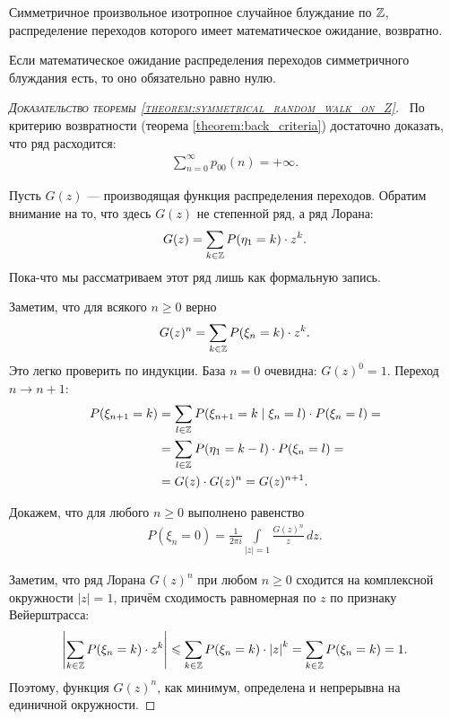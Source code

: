 \documentclass[../main.tex]{subfiles}
\begin{document}
\begin{thm}
 \label{theorem:symmetrical_random_walk_on_Z}
 Симметричное произвольное изотропное случайное блуждание по $ \mathbb{Z} $, распределение переходов которого имеет математическое ожидание, возвратно.
\end{thm}
\begin{remrk*}
 Если математическое ожидание распределения переходов симметричного блуждания есть, то оно обязательно равно нулю.
\end{remrk*}
\begin{proof}[\normalfont\textsc{Доказательство теоремы \ref{theorem:symmetrical_random_walk_on_Z}}]\
 По критерию возвратности (теорема \ref{theorem:back_criteria}) достаточно доказать, что ряд расходится:
 \begin{align}
  \label{eq:symmetrical_random_walk_on_Z:main_series_to_prove}
  \sum_{n=0}^{\infty}p_{00}(n) = +\infty.
 \end{align}

 Пусть $ G(z) $ --- производящая функция распределения переходов. Обратим внимание на то, что здесь $ G(z) $ не степенной ряд, а ряд Лорана:
 \begin{align*}
  G(z) = \sum_{k \in \mathbb{Z}} P(\eta_1 = k) \cdot z^{k}.
 \end{align*} Пока-что мы рассматриваем этот ряд лишь как формальную запись.

 Заметим, что для всякого $ n \geqslant 0 $ верно
 \begin{align*}
  G(z)^{n} = \sum_{k \in \mathbb{Z}} P(\xi_n = k) \cdot z^{k}.
 \end{align*} Это легко проверить по индукции. База $ n=0 $ очевидна: $ G(z)^{0} = 1 $. Переход $ n \to n+1 $:
 \begin{align*}
  P(\xi_{n+1} = k) &= \sum_{l \in \mathbb{Z}} P(\xi_{n+1} = k \mid \xi_n = l) \cdot P(\xi_n = l) = \\
  &= \sum_{l \in \mathbb{Z}}P(\eta_1 = k - l) \cdot P(\xi_n = l) = \\
  &= G(z) \cdot G(z)^{n} = G(z)^{n+1}.
 \end{align*}

 Докажем, что для любого $ n \geqslant 0 $  выполнено равенство
 \begin{align}
  \label{eq:symmetrical_random_walk_on_Z:2_pi_i_integral}
   P(\xi_n = 0) = \frac{1}{2\pi i} \int\limits_{\left| z \right|=1}   \frac{G(z)^{n}}{z}\,dz.
 \end{align}

 Заметим, что ряд Лорана $G(z)^{n}$ при любом $ n \geqslant 0 $ сходится на комплексной окружности $ \left| z \right|=1 $, причём сходимость равномерная по $ z $ по признаку Вейерштрасса:
 \begin{align*}
  \left| \sum_{k\in\mathbb{Z}}P(\xi_n=k) \cdot z^{k} \right| \leqslant \sum_{k \in \mathbb{Z}}P(\xi_n=k) \cdot \left| z \right|^{k} = \sum_{k \in\mathbb{Z}}P(\xi_n = k) = 1.
 \end{align*} Поэтому, функция $ G(z)^{n} $, как минимум, определена и непрерывна на единичной окружности.


\end{proof}
\end{document}
